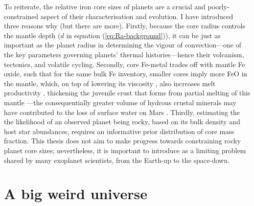 To reiterate, the relative iron core sizes of planets are a crucial and poorly-constrained aspect of their characterisation and evolution. I have introduced three reasons why (but there are more). Firstly, because the core radius controls the mantle depth ($d$ in equation (\ref{eq:Ra-background})), it can be just as important as the planet radius in determining the vigour of convection---one of the key parameters governing planets' thermal histories---hence their volcanism, tectonics, and volatile cycling. Secondly, core Fe-metal trades off with mantle Fe oxide, such that for the same bulk Fe inventory, smaller cores imply more FeO in the mantle, which, on top of lowering its viscosity \citep{zhao_effect_2009}, also increases melt productivity \citep{hirschmann_mantle_2000, kiefer_effects_2015}, thickening the juvenile crust that forms from partial melting of this mantle \citep{wade_divergent_2017, dyck_effect_2021}---the consequentially greater volume of hydrous crustal minerals may have contributed to the loss of surface water on Mars \citep{wade_divergent_2017}. Thirdly, estimating the the likelihood of an observed planet being rocky, based on its bulk density and host star abundances, requires an informative prior distribution of core mass fraction. %
This thesis does not aim to make progress towards constraining rocky planet core sizes; nevertheless, it is important to introduce as a limiting problem shared by many exoplanet scientists, from the Earth-up to the space-down. 









\section{A big weird universe}

